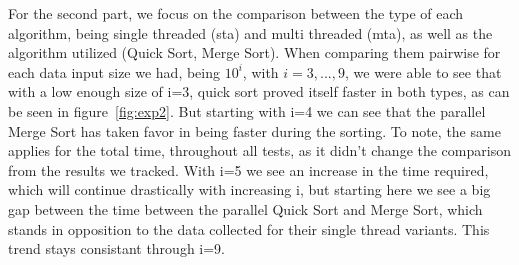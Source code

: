 \documentclass[twocolumn]{article}
\begin{document}
For the second part, we focus on the comparison between the type of each algorithm, being single threaded (sta) and multi threaded (mta), as well as the algorithm utilized (Quick Sort, Merge Sort). When comparing them pairwise for each data input size we had, being $10^i$, with $i = 3,...,9$, we were able to see that with a low enough size of i=3, quick sort proved itself faster in both types, as can be seen in figure~\ref{fig:exp2}. But starting with i=4 we can see that the parallel Merge Sort has taken favor in being faster during the sorting. To note, the same applies for the total time, throughout all tests, as it didn't change the comparison from the results we tracked. With i=5 we see an increase in the time required, which will continue drastically with increasing i, but starting here we see a big gap between the time between the parallel Quick Sort and Merge Sort, which stands in opposition to the data collected for their single thread variants. This trend stays consistant through i=9.
\end{document}
